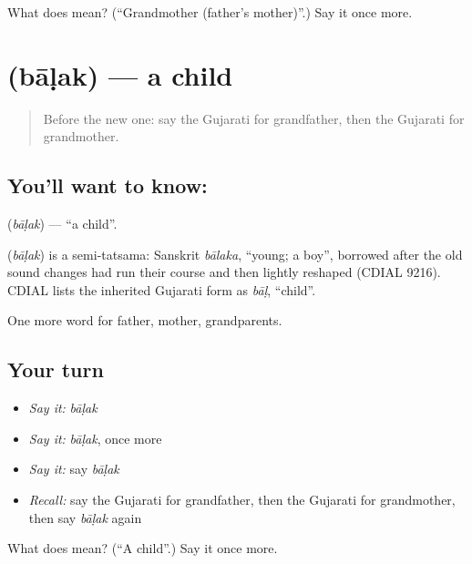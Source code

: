 \begin{tcolorbox}[breakable,colback=teal!4,colframe=teal!35!black,title={Before you move on}]
What does  mean? (\textquotedblleft{}Grandmother (father's mother)\textquotedblright{}.) Say it once more.
\end{tcolorbox}
\section[\texorpdfstring{\gu{બાળક} (bāḷak)}{બાળક (bāḷak)}]{ (bāḷak) — a child}

\label{lesson:GU-C51-child}



\begin{quote}
Before the new one: say the Gujarati for grandfather, then the Gujarati for grandmother.
\end{quote}

\subsection*{You'll want to know: }
\textbf{} (\emph{bāḷak}) — \textquotedblleft{}a child\textquotedblright{}.

\begin{cousinweb}
\textbf{} (\emph{bāḷak}) is a semi-tatsama: Sanskrit \emph{bālaka}, \textquotedblleft{}young; a boy\textquotedblright{}, borrowed after the old sound changes had run their course and then lightly reshaped (CDIAL 9216). CDIAL lists the inherited Gujarati form as \emph{bāḷ}, \textquotedblleft{}child\textquotedblright{}.
\end{cousinweb}

\begin{grammarlens}[title={What you've built}]
One more word for father, mother, grandparents.
\end{grammarlens}

\subsection*{Your turn}
\begin{itemize}
\raggedright
  \item \emph{Say it:} \emph{bāḷak}
  \item \emph{Say it:} \emph{bāḷak}, once more
  \item \emph{Say it:} say \emph{bāḷak}
  \item \emph{Recall:} say the Gujarati for grandfather, then the Gujarati for grandmother, then say \emph{bāḷak} again
\end{itemize}

\begin{tcolorbox}[breakable,colback=teal!4,colframe=teal!35!black,title={Before you move on}]
What does  mean? (\textquotedblleft{}A child\textquotedblright{}.) Say it once more.
\end{tcolorbox}
